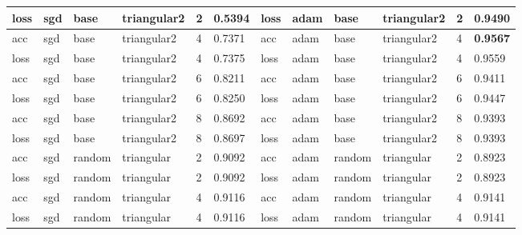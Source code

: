 \begin{table}[H]
\begin{adjustbox}{width=1\textwidth}
\begin{tabular}{|l|l|l|l|l|l||l|l|l|l|l|l|}
loss          & sgd          & base          & triangular2     & 2             & 0.5394            & loss          & adam         & base          & triangular2     & 2             & 0.9490            \\ \hline
acc           & sgd          & base          & triangular2     & 4             & 0.7371            & acc           & adam         & base          & triangular2     & 4             & \textbf{0.9567}   \\ \hline
loss          & sgd          & base          & triangular2     & 4             & 0.7375            & loss          & adam         & base          & triangular2     & 4             & 0.9559            \\ \hline
acc           & sgd          & base          & triangular2     & 6             & 0.8211            & acc           & adam         & base          & triangular2     & 6             & 0.9411            \\ \hline
loss          & sgd          & base          & triangular2     & 6             & 0.8250            & loss          & adam         & base          & triangular2     & 6             & 0.9447            \\ \hline
acc           & sgd          & base          & triangular2     & 8             & 0.8692            & acc           & adam         & base          & triangular2     & 8             & 0.9393            \\ \hline
loss          & sgd          & base          & triangular2     & 8             & 0.8697            & loss          & adam         & base          & triangular2     & 8             & 0.9393            \\ \hline
acc           & sgd          & random        & triangular      & 2             & 0.9092            & acc           & adam         & random        & triangular      & 2             & 0.8923            \\ \hline
loss          & sgd          & random        & triangular      & 2             & 0.9092            & loss          & adam         & random        & triangular      & 2             & 0.8923            \\ \hline
acc           & sgd          & random        & triangular      & 4             & 0.9116            & acc           & adam         & random        & triangular      & 4             & 0.9141            \\ \hline
loss          & sgd          & random        & triangular      & 4             & 0.9116            & loss          & adam         & random        & triangular      & 4             & 0.9141            \\ \hline

\end{tabular}
\end{adjustbox}
\end{table}

